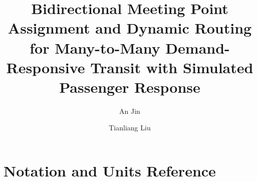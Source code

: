 \documentclass[review,12pt]{elsarticle}
\begin{document}
\begin{frontmatter}

\title{Bidirectional Meeting Point Assignment and Dynamic Routing for Many-to-Many Demand-Responsive Transit with Simulated Passenger Response}

\author[buaa]{An Jin}
\author[buaa]{Tianliang Liu}
\address[buaa]{School of Transportation Science and Engineering, Beihang University, Beijing 100191, China}



\end{frontmatter}












\appendix

\section{Notation and Units Reference}
\label{sec:appendix-notation}
\end{document}
